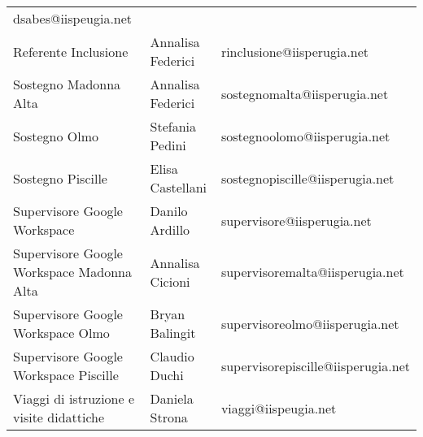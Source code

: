 \begin{center}
\begin{tabular}{lll}
	dsabes@iispeugia.net\\
	Referente Inclusione&
	Annalisa Federici&
	rinclusione@iisperugia.net\\
	Sostegno Madonna Alta&
	Annalisa Federici&
	sostegnomalta@iisperugia.net\\
	Sostegno Olmo&
	Stefania Pedini&
	sostegnoolomo@iisperugia.net\\
	Sostegno Piscille&
	Elisa Castellani&
	sostegnopiscille@iisperugia.net\\
	Supervisore Google Workspace &
	Danilo Ardillo&
	supervisore@iisperugia.net\\
	Supervisore Google Workspace Madonna Alta&
	Annalisa Cicioni&
	supervisoremalta@iisperugia.net\\
	Supervisore Google Workspace Olmo&
	Bryan Balingit&
	supervisoreolmo@iisperugia.net\\
	Supervisore Google Workspace Piscille&
	Claudio Duchi&
	supervisorepiscille@iisperugia.net\\
	Viaggi di istruzione e visite didattiche&
	Daniela Strona&
	viaggi@iispeugia.net\\
	\bottomrule
\end{tabular}
\end{center}
